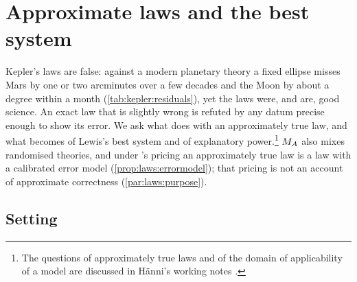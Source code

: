 \section{Approximate laws and the best system}\label{sec:laws}

Kepler's laws are false: against a modern planetary theory a fixed ellipse misses Mars by one or two arcminutes over a few decades and the Moon by about a degree within a month (\cref{tab:kepler:residuals}), yet the laws were, and are, good science. An exact law that is slightly wrong is refuted by any datum precise enough to show its error. We ask what \SAIabbr does with an approximately true law, and what becomes of Lewis's best system and of explanatory power.\footnote{The questions of approximately true laws and of the domain of applicability of a model are discussed in H\"anni's working notes \citep{hanni2026notes}.} $M_{A}$ also mixes randomised theories, and under \SAIabbr's pricing an approximately true law is a law with a calibrated error model (\cref{prop:laws:errormodel}); that pricing is not an account of approximate correctness (\cref{par:laws:purpose}).

\subsection{Setting}\label{sec:laws:setting}

